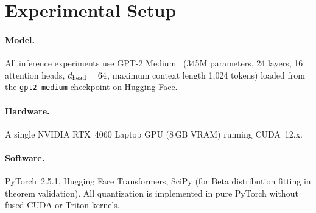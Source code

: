 
\section{Experimental Setup}
\label{sec:setup}

\paragraph{Model.}
All inference experiments use GPT-2 Medium~\cite{radford2019gpt2}
(345M parameters, 24 layers, 16 attention heads, $d_{\text{head}} = 64$,
maximum context length 1{,}024 tokens) loaded from the
\texttt{gpt2-medium} checkpoint on Hugging Face.

\paragraph{Hardware.}
A single NVIDIA RTX~4060 Laptop GPU (8\,GB VRAM) running CUDA~12.x.

\paragraph{Software.}
PyTorch~2.5.1, Hugging Face Transformers, SciPy (for Beta distribution
fitting in theorem validation).
All quantization is implemented in pure PyTorch without fused CUDA
or Triton kernels.

